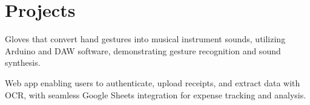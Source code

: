 \documentclass[]{resume-openfont}
\begin{document}
\begin{minipage}[t]{1\textwidth}
\vspace{-4 mm}
\section{Projects}
\titlerule
\vspace{2.5 mm}

Gloves that convert hand gestures into musical instrument sounds, utilizing Arduino and DAW software, demonstrating gesture recognition and sound synthesis.
\sectionsep

Web app enabling users to authenticate, upload receipts, and extract data with OCR, with seamless Google Sheets integration for expense tracking and analysis.
\sectionsep

\end{minipage}
\end{document}
